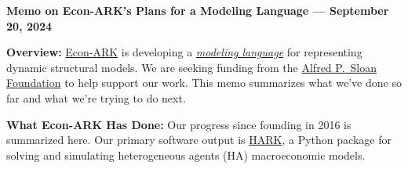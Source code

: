 \documentclass[12pt,pdftex,letterpaper]{article}
\begin{document}
\begin{center}
	\textbf{Memo on Econ-ARK's Plans for a Modeling Language --- September 20, 2024}
\end{center}


\noindent \textbf{Overview:} \href{https://econ-ark.org/}{Econ-ARK} is developing a \href{https://ampl.com/wp-content/uploads/amlopt.pdf}{\textit{modeling language}} for representing dynamic structural models. We are seeking funding from the \href{https://sloan.org/}{Alfred P.\ Sloan Foundation} to help support our work. This memo summarizes what we've done so far and what we're trying to do next.

\vspace{0.35cm}

\noindent \textbf{What Econ-ARK Has Done:} Our progress since founding in 2016 is summarized here. Our primary software output is \href{https://github.com/econ-ark/HARK}{HARK}, a Python package for solving and simulating heterogeneous agents (HA) macroeconomic models.
\end{document}
